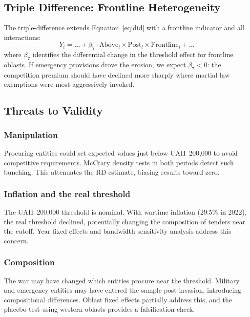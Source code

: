 \documentclass[12pt]{article}
\begin{document}
\subsection{Triple Difference: Frontline Heterogeneity}

The triple-difference extends Equation~\ref{eq:did} with a frontline indicator and all interactions:
\begin{equation}
Y_i = \ldots + \beta_7 \cdot \text{Above}_i \times \text{Post}_i \times \text{Frontline}_i + \ldots
\label{eq:ddd}
\end{equation}
where $\beta_7$ identifies the differential change in the threshold effect for frontline oblasts. If emergency provisions drove the erosion, we expect $\beta_7 < 0$: the competition premium should have declined more sharply where martial law exemptions were most aggressively invoked.

\subsection{Threats to Validity}

\subsubsection*{Manipulation} Procuring entities could set expected values just below UAH~200,000 to avoid competitive requirements. McCrary density tests in both periods detect such bunching. This attenuates the RD estimate, biasing results toward zero.

\subsubsection*{Inflation and the real threshold} The UAH~200,000 threshold is nominal. With wartime inflation (29.5\% in 2022), the real threshold declined, potentially changing the composition of tenders near the cutoff. Year fixed effects and bandwidth sensitivity analysis address this concern.

\subsubsection*{Composition} The war may have changed which entities procure near the threshold. Military and emergency entities may have entered the sample post-invasion, introducing compositional differences. Oblast fixed effects partially address this, and the placebo test using western oblasts provides a falsification check.
\end{document}
